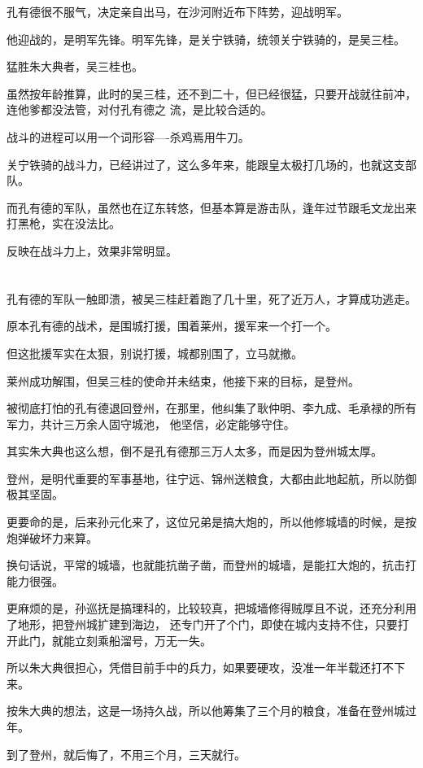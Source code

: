 \documentclass[11pt,a4paper,onecolumn]{article}
\begin{document}
孔有德很不服气，决定亲自出马，在沙河附近布下阵势，迎战明军。

他迎战的，是明军先锋。明军先锋，是关宁铁骑，统领关宁铁骑的，是吴三桂。

猛胜朱大典者，吴三桂也。

虽然按年龄推算，此时的吴三桂，还不到二十，但已经很猛，只要开战就往前冲，连他爹都没法管，对付孔有德之
流，是比较合适的。

战斗的进程可以用一个词形容----杀鸡焉用牛刀。

关宁铁骑的战斗力，已经讲过了，这么多年来，能跟皇太极打几场的，也就这支部队。

而孔有德的军队，虽然也在辽东转悠，但基本算是游击队，逢年过节跟毛文龙出来打黑枪，实在没法比。

反映在战斗力上，效果非常明显。

\section[\thesection]{}

孔有德的军队一触即溃，被吴三桂赶着跑了几十里，死了近万人，才算成功逃走。

原本孔有德的战术，是围城打援，围着莱州，援军来一个打一个。

但这批援军实在太狠，别说打援，城都别围了，立马就撤。

莱州成功解围，但吴三桂的使命并未结束，他接下来的目标，是登州。

被彻底打怕的孔有德退回登州，在那里，他纠集了耿仲明、李九成、毛承禄的所有军力，共计三万余人固守城池，
他坚信，必定能够守住。

其实朱大典也这么想，倒不是孔有德那三万人太多，而是因为登州城太厚。

登州，是明代重要的军事基地，往宁远、锦州送粮食，大都由此地起航，所以防御极其坚固。

更要命的是，后来孙元化来了，这位兄弟是搞大炮的，所以他修城墙的时候，是按炮弹破坏力来算。

换句话说，平常的城墙，也就能抗凿子凿，而登州的城墙，是能扛大炮的，抗击打能力很强。

更麻烦的是，孙巡抚是搞理科的，比较较真，把城墙修得贼厚且不说，还充分利用了地形，把登州城扩建到海边，
还专门开了个门，即使在城内支持不住，只要打开此门，就能立刻乘船溜号，万无一失。

所以朱大典很担心，凭借目前手中的兵力，如果要硬攻，没准一年半载还打不下来。

按朱大典的想法，这是一场持久战，所以他筹集了三个月的粮食，准备在登州城过年。

到了登州，就后悔了，不用三个月，三天就行。
\end{document}

